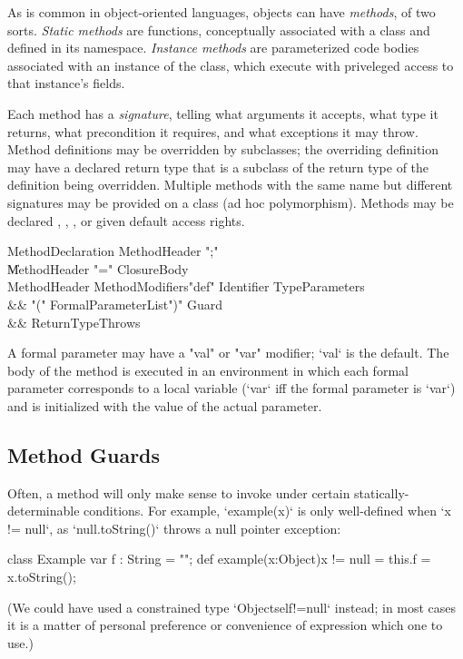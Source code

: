 As is common in object-oriented languages, objects can have {\em methods}, of
two sorts.  {\em Static methods} are functions, conceptually associated with a
class and defined in its namespace.  {\em Instance methods} are parameterized
code bodies associated with an instance of the class, which execute with
priveleged access to that instance's fields. 

Each method has a {\em signature}, telling what arguments it accepts, what
type it returns, what precondition it requires, and what exceptions it may
throw. Method definitions may be overridden by subclasses; the overriding
definition may have a declared return type that is a subclass of the return
type of the definition being overridden. Multiple methods with the same name
but different signatures may be provided on a class (ad hoc polymorphism).
Methods may be declared , , , or given
default access rights.


\begin{grammar}
MethodDeclaration \: MethodHeader \xcd";" \\
                  \| MethodHeader \xcd"=" ClosureBody \\
MethodHeader \:  
  MethodModifiers\opt \xcd"def" Identifier TypeParameters\opt \\
&& \xcd"(" 
  FormalParameterList\opt \xcd")" Guard\opt \\
  && ReturnType\opt Throws\opt \\
\end{grammar}

A formal parameter may have a \xcd"val" or \xcd"var"
modifier; \xcd`val` is the default.
The body of the method is executed in an environment in which 
each formal parameter corresponds to a local variable (\xcd`var` iff the
formal parameter is \xcd`var`)
and is initialized with the value of the actual parameter.


\subsection{Method Guards}
\label{MethodGuard}

Often, a method will only make sense to invoke under certain
statically-determinable conditions.  For example, \xcd`example(x)` is only
well-defined when \xcd`x != null`, as \xcd`null.toString()` throws a null
pointer exception: 
\begin{xten}
class Example {
   var f : String = "";
   def example(x:Object){x != null} = {
      this.f = x.toString();
   }
}
\end{xten}
%
\noindent
(We could have used a constrained type \xcd`Object{self!=null}` instead; in
most cases it is a matter of personal preference or convenience of expression
which one to use.) 

